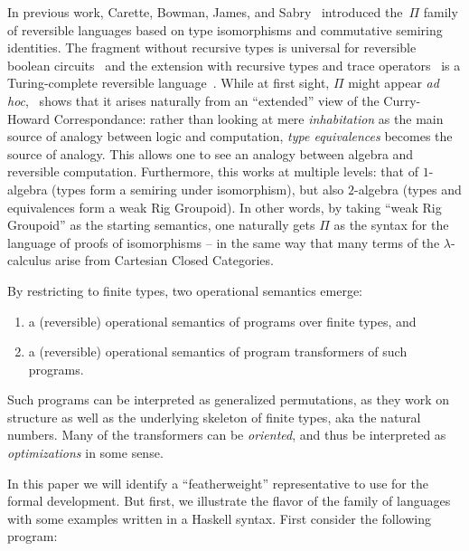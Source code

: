 \documentclass{entcs}
\begin{document}
In previous work, Carette, Bowman, James, and
Sabry~\cite{rc2011,James:2012:IE:2103656.2103667,Carette2016} introduced
the~$\Pi$ family of reversible languages based on type isomorphisms and
commutative semiring identities. The fragment without recursive types is
universal for reversible boolean circuits~\cite{James:2012:IE:2103656.2103667}
and the extension with recursive types and trace
operators~\cite{Hasegawa:1997:RCS:645893.671607} is a Turing-complete reversible
language~\cite{James:2012:IE:2103656.2103667,rc2011}. While at first sight,
$\Pi$ might appear \emph{ad hoc},~\cite{Carette2016} shows that it arises naturally
from an ``extended'' view of the Curry-Howard Correspondance: rather than looking
at mere \emph{inhabitation} as the main source of analogy between logic
and computation, \emph{type equivalences} becomes the source of analogy.  This
allows one to see an analogy between algebra and reversible computation.
Furthermore, this works at multiple levels: that of $1$-algebra (types form a
semiring under isomorphism), but also $2$-algebra (types and equivalences form a
weak Rig Groupoid).  In other words, by taking ``weak Rig Groupoid'' as the
starting semantics, one naturally gets $\Pi$ as the syntax for the language of
proofs of isomorphisms -- in the same way that many terms of the
$\lambda$-calculus arise from Cartesian Closed Categories.

By restricting to finite types, two operational semantics emerge:
\begin{enumerate}
\item a (reversible) operational semantics of programs over finite types, and
\item a (reversible) operational semantics of program transformers of such programs.
\end{enumerate}
Such programs can be interpreted as generalized permutations, as they work on
structure as well as the underlying skeleton of finite types, aka the natural numbers.
Many of the transformers can be \emph{oriented}, and thus be interpreted as
\emph{optimizations} in some sense.

In this paper we will
identify a ``featherweight'' representative to use for the formal
development. But first, we illustrate the flavor of the family of languages with
some examples written in a Haskell syntax. First consider the following program:
\end{document}
